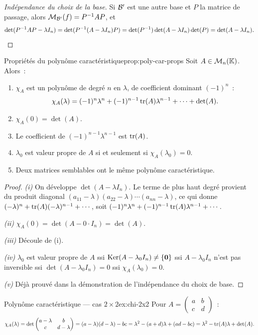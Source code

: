 \begin{proof}[Indépendance du choix de la base]
  Si ${\mathcal{B}}'$ est une autre base et $P$ la matrice de passage, alors
  $\mathcal{M}_{{\mathcal{B}}'}(f)={P}^{-1}AP$, et
  \[
    \det({P}^{-1}AP-\lambda I_n)=\det({P}^{-1}(A-\lambda I_n)P)
    =\det({P}^{-1})\det(A-\lambda I_n)\det(P)=\det(A-\lambda I_n).
    \qedhere
  \]
\end{proof}

\begin{proposition}{Propriétés du polynôme caractéristique}{prop:poly-car-props}
  Soit $A\in\mathcal{M}_n({\mathbb{K}})$. Alors~:
  \begin{enumerate}[label=(\roman*)]
    \item $\chi_A$ est un polynôme de degré $n$ en $\lambda$, de
      coefficient dominant $(-1)^n$~:
      \[
        \chi_A(\lambda)=(-1)^n\lambda^n+(-1)^{n-1}\operatorname{tr}(A)\lambda^{n-1}
        +\cdots+\det(A).
      \]
    \item $\chi_A(0)=\det(A)$.
    \item Le coefficient de $(-1)^{n-1}\lambda^{n-1}$ est $\operatorname{tr}(A)$.
    \item $\lambda_0$ est valeur propre de $A$ si et seulement si
      $\chi_A(\lambda_0)=0$.
    \item Deux matrices semblables ont le même polynôme caractéristique.
  \end{enumerate}
\end{proposition}

\begin{proof}
  \emph{(i)} On développe $\det(A-\lambda I_n)$. Le terme de plus haut
  degré provient du produit diagonal
  $(a_{11}-\lambda)(a_{22}-\lambda)\cdots(a_{nn}-\lambda)$, ce qui donne
  $(-\lambda)^n+\operatorname{tr}(A)(-\lambda)^{n-1}+\cdots$, soit
  $(-1)^n\lambda^n+(-1)^{n-1}\operatorname{tr}(A)\lambda^{n-1}+\cdots$.

  \emph{(ii)} $\chi_A(0)=\det(A-0\cdot I_n)=\det(A)$.

  \emph{(iii)} Découle de (i).

  \emph{(iv)} $\lambda_0$ est valeur propre de $A$ ssi
  $\operatorname{Ker}(A-\lambda_0 I_n)\neq\left\{\mathbf{0}\right\}$ ssi $A-\lambda_0 I_n$ n'est
  pas inversible ssi $\det(A-\lambda_0 I_n)=0$ ssi
  $\chi_A(\lambda_0)=0$.

  \emph{(v)} Déjà prouvé dans la démonstration de l'indépendance du
  choix de base.
\end{proof}

\begin{example}{Polynôme caractéristique --- cas $2\times 2$}{ex:chi-2x2}
  Pour $A=\begin{pmatrix}a&b\\c&d\end{pmatrix}$~:
  \[
    \chi_A(\lambda)=\det\begin{pmatrix}a-\lambda&b\\c&d-\lambda\end{pmatrix}
    =(a-\lambda)(d-\lambda)-bc
    =\lambda^2-(a+d)\lambda+(ad-bc)
    =\lambda^2-\operatorname{tr}(A)\lambda+\det(A).
  \]
\end{example}

